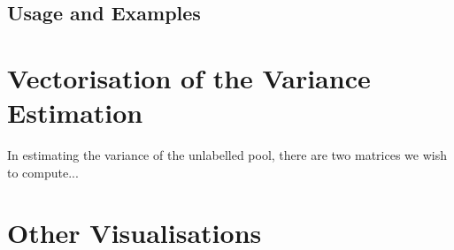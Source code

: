 \section{Usage and Examples}
\label{sec:usage}


\chapter{Vectorisation of the Variance Estimation}
\label{cha:vectorise}

In estimating the variance of the unlabelled pool, there are two matrices we wish to compute...


\chapter{Other Visualisations}




